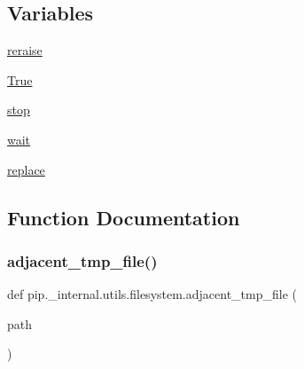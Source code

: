 \subsection*{Variables}
\begin{DoxyCompactItemize}
\item 
\hyperlink{namespacepip_1_1__internal_1_1utils_1_1filesystem_a69608bbfffc4670e6c59d61721b8ce60}{reraise}
\item 
\hyperlink{namespacepip_1_1__internal_1_1utils_1_1filesystem_a0aee39b82f77071dd9209814015b972f}{True}
\item 
\hyperlink{namespacepip_1_1__internal_1_1utils_1_1filesystem_af9a7f6ff900b61116d7fb152d8557c58}{stop}
\item 
\hyperlink{namespacepip_1_1__internal_1_1utils_1_1filesystem_a2c4b554d037eec4dda70e88669044ddd}{wait}
\item 
\hyperlink{namespacepip_1_1__internal_1_1utils_1_1filesystem_a2fc3733bb724a9f843d542afc5a19055}{replace}
\end{DoxyCompactItemize}


\subsection{Function Documentation}
\mbox{\label{namespacepip_1_1__internal_1_1utils_1_1filesystem_a7021b68876635eb4bc8040b7b794d971}} 
\subsubsection{\texorpdfstring{adjacent\+\_\+tmp\+\_\+file()}{adjacent\_tmp\_file()}}
{\footnotesize\ttfamily def pip.\+\_\+internal.\+utils.\+filesystem.\+adjacent\+\_\+tmp\+\_\+file (\begin{DoxyParamCaption}\item[{}]{path }\end{DoxyParamCaption})}

\mbox{\label{namespacepip_1_1__internal_1_1utils_1_1filesystem_a3424f1b7108c40853a810f9b9ba76bd1}} 
